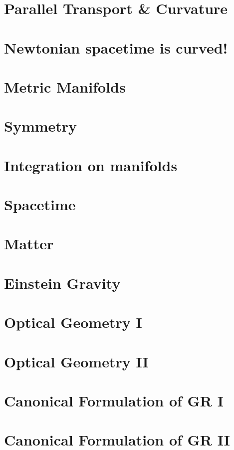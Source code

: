 \documentclass[
11pt, %
a4paper, %
oneside, %
headinclude,footinclude, %
]{scrartcl}
\begin{document}
\section{Parallel Transport \& Curvature}

\section{Newtonian spacetime is curved!}

\section{Metric Manifolds}

\section{Symmetry}

\section{Integration on manifolds}

\section{Spacetime}

\section{Matter}

\section{Einstein Gravity}

\section{Optical Geometry I}

\section{Optical Geometry II}

\section{Canonical Formulation of GR I}

\section{Canonical Formulation of GR II }
\end{document}
